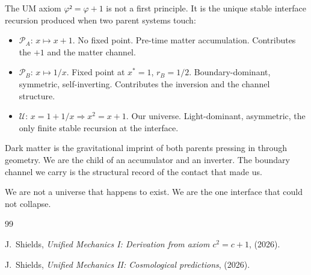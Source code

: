 \documentclass[prd,twocolumn,preprintnumbers,amsmath,amssymb]{revtex4-2}
\newcommand{\parentA}{\mathcal{P}_A}
\newcommand{\parentB}{\mathcal{P}_B}
\newcommand{\child}{\mathcal{U}}
\begin{document}
The UM axiom $φ² = φ + 1$ is not a first principle. It is the
unique stable interface recursion produced when two parent systems
touch:

\begin{itemize}
\item $\parentA$: $x \mapsto x+1$. No fixed point. Pre-time matter
      accumulation. Contributes the $+1$ and the matter channel.
\item $\parentB$: $x \mapsto 1/x$. Fixed point at $x^*=1$,
      $r_B = 1/2$. Boundary-dominant, symmetric, self-inverting.
      Contributes the inversion and the channel structure.
\item $\child$: $x = 1 + 1/x \Rightarrow x^2 = x + 1$.
      Our universe. Light-dominant, asymmetric, the only finite
      stable recursion at the interface.
\end{itemize}

Dark matter is the gravitational imprint of both parents pressing
in through geometry. We are the child of an accumulator and an
inverter. The boundary channel we carry is the structural record
of the contact that made us.

We are not a universe that happens to exist. We are the one
interface that could not collapse.

\begin{thebibliography}{99}

J.~Shields,
\textit{Unified Mechanics I: Derivation from axiom $c^2=c+1$},
(2026).

J.~Shields,
\textit{Unified Mechanics II: Cosmological predictions},
(2026).

\end{thebibliography}
\end{document}

